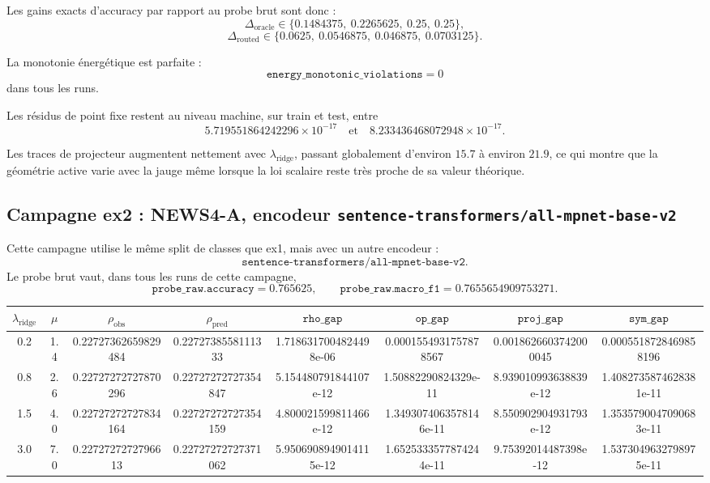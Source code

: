 Les gains exacts d’accuracy par rapport au probe brut sont donc :
\[
\Delta_{\mathrm{oracle}} \in \{0.1484375,\ 0.2265625,\ 0.25,\ 0.25\},
\]
\[
\Delta_{\mathrm{routed}} \in \{0.0625,\ 0.0546875,\ 0.046875,\ 0.0703125\}.
\]

La monotonie énergétique est parfaite :
\[
\texttt{energy\_monotonic\_violations}=0
\]
dans tous les runs.

Les résidus de point fixe restent au niveau machine, sur train et test, entre
\[
5.719551864242296\times 10^{-17}
\quad\text{et}\quad
8.233436468072948\times 10^{-17}.
\]

Les traces de projecteur augmentent nettement avec \(\lambda_{\mathrm{ridge}}\), passant globalement d’environ \(15.7\) à environ \(21.9\), ce qui montre que la géométrie active varie avec la jauge même lorsque la loi scalaire reste très proche de sa valeur théorique.

\subsection{Campagne ex2 : NEWS4-A, encodeur \texttt{sentence-transformers/all-mpnet-base-v2}}

Cette campagne utilise le même split de classes que ex1, mais avec un autre encodeur :
\[
\texttt{sentence-transformers/all-mpnet-base-v2}.
\]
Le probe brut vaut, dans tous les runs de cette campagne,
\[
\texttt{probe\_raw.accuracy}=0.765625,
\qquad
\texttt{probe\_raw.macro\_f1}=0.7655654909753271.
\]

\begin{center}
\small
\begin{tabular}{c c c c c c c c}
\hline
\(\lambda_{\mathrm{ridge}}\) & \(\mu\) & \(\rho_{\mathrm{obs}}\) & \(\rho_{\mathrm{pred}}\) & \(\texttt{rho\_gap}\) & \(\texttt{op\_gap}\) & \(\texttt{proj\_gap}\) & \(\texttt{sym\_gap}\) \\
\hline
0.2 & 1.4 & 0.22727362659829484 & 0.2272738558111333 & 1.7186317004824498e-06 & 0.0001554931757878567 & 0.0018626603742000045 & 0.0005518728469858196 \\
0.8 & 2.6 & 0.22727272727870296 & 0.22727272727354847 & 5.154480791844107e-12 & 1.50882290824329e-11 & 8.939010993638839e-12 & 1.4082735874628381e-11 \\
1.5 & 4.0 & 0.22727272727834164 & 0.22727272727354159 & 4.800021599811466e-12 & 1.3493074063578146e-11 & 8.550902904931793e-12 & 1.3535790047090683e-11 \\
3.0 & 7.0 & 0.2272727272796613 & 0.22727272727371062 & 5.9506908949014115e-12 & 1.6525333577874244e-11 & 9.75392014487398e-12 & 1.5373049632798975e-11 \\
\hline
\end{tabular}
\end{center}

